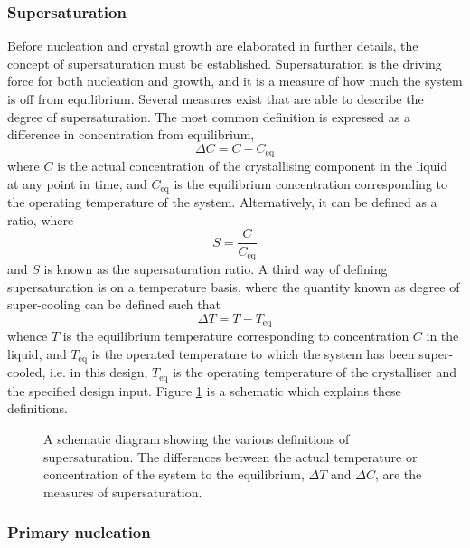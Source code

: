 \subsubsection{Supersaturation}

Before nucleation and crystal growth are elaborated in further details, the concept of supersaturation must be established. Supersaturation is the driving force for both nucleation and growth, and it is a measure of how much the system is off from equilibrium. Several measures exist that are able to describe the degree of supersaturation. The most common definition is expressed as a difference in concentration from equilibrium,
\begin{equation}\label{eq:deltaC}
    \Delta C = C - C_{\mathrm{eq}}
\end{equation}
where $C$ is the actual concentration of the crystallising component in the liquid at any point in time, and $C_{\mathrm{eq}}$ is the equilibrium concentration corresponding to the operating temperature of the system. Alternatively, it can be defined as a ratio, where
\begin{equation} \label{eq: supersaturation ratio}
    S = \frac{C}{C_{\mathrm{eq}}}
\end{equation}
and $S$ is known as the supersaturation ratio. A third way of defining supersaturation is on a temperature basis, where the quantity known as degree of super-cooling can be defined such that
\begin{equation} \label{eq:deltaT}
     \Delta T = T - T_{\mathrm{eq}}
\end{equation}
whence $T$ is the equilibrium temperature corresponding to concentration $C$ in the liquid, and $T_{\mathrm{eq}}$ is the operated temperature to which the system has been super-cooled, i.e. in this design, $T_{\mathrm{eq}}$ is the operating temperature of the crystalliser and the specified design input. Figure \ref{fig:supersaturation} is a schematic which explains these definitions.

\begin{figure}[h]
\centering

\caption{A schematic diagram showing the various definitions of supersaturation. The differences between the actual temperature or concentration of the system to the equilibrium, $\Delta T$ and $\Delta C$, are the measures of supersaturation.}
\label{fig:supersaturation}
\end{figure}

\subsubsection{Primary nucleation}\label{sec:primary nucleation}


